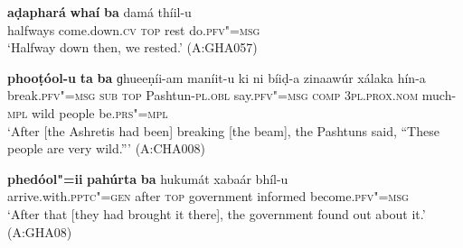 \ex
\label{ex:14-116}
\gll \textbf{aḍaphará} \textbf{whaí} \textbf{ba} damá thíil-u \\
halfways come.down.\textsc{cv} \textsc{top} rest do.\textsc{pfv"=msg } \\
\glt `Halfway down then, we rested.' (A:GHA057)

\ex
\label{ex:14-117}
\gll \textbf{phooṭóol-u} \textbf{ta} \textbf{ba} ɡhueeṇíi-am maníit-u ki ni bíiḍ-a zinaawúr
xálaka hín-a\\
break.\textsc{pfv"=msg} \textsc{sub} \textsc{top} Pashtun-\textsc{pl.obl} say.\textsc{pfv"=msg}  \textsc{comp} \textsc{3pl.prox.nom} much-\textsc{mpl} wild people be.\textsc{prs"=mpl}\\
\glt `After [the Ashretis had been] breaking [the beam], the Pashtuns said, ``These people are very wild.''' (A:CHA008)

\ex
\label{ex:14-118}
\gll \textbf{phedóol"=ii} \textbf{pahúrta} \textbf{ba} hukumát xabaár  bhíl-u\\
arrive.with.\textsc{pptc"=gen} after \textsc{top} government informed become.\textsc{pfv"=msg}\\
\glt `After that [they had brought it there], the government found out about it.' (A:GHA08)
\z

